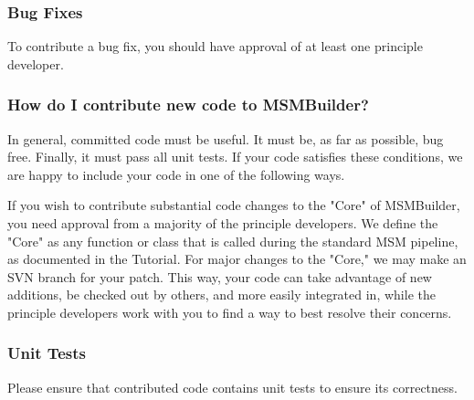 \documentclass[12pt]{article}
\begin{document}
\subsubsection{Bug Fixes}

To contribute a bug fix, you should have approval of at least one principle developer.  

\subsubsection{How do I contribute new code to MSMBuilder?}

In general, committed code must be useful.  It must be, as far as possible, bug free.  Finally, it must pass all unit tests.  If your code satisfies these conditions, we are happy to include your code in one of the following ways.   

If you wish to contribute substantial code changes to the "Core" of MSMBuilder, you need approval from a majority of the principle developers.  We define the "Core" as any function or class that is called during the standard MSM pipeline, as documented in the Tutorial.  For major changes to the "Core," we may make an SVN branch for your patch.  This way, your code can take advantage of new additions, be checked out by others, and more easily integrated in, while the principle developers work with you to find a way to best resolve their concerns.



\subsubsection{Unit Tests}

Please ensure that contributed code contains unit tests to ensure its correctness.
\end{document}
